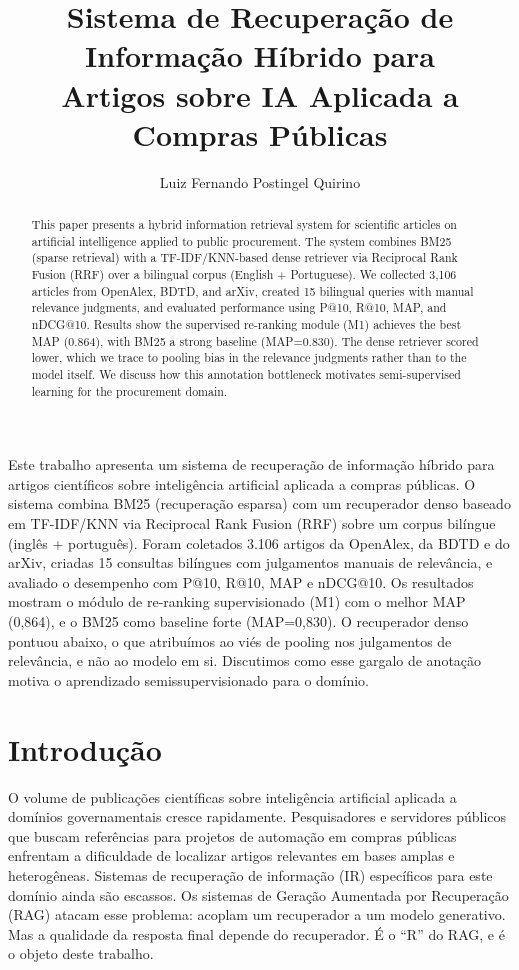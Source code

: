 \documentclass[12pt]{article}
\title{Sistema de Recuperação de Informação Híbrido para\\Artigos sobre IA Aplicada a Compras Públicas}
\author{Luiz Fernando Postingel Quirino\inst{1}}
\begin{document}
\maketitle

\begin{abstract}
This paper presents a hybrid information retrieval system for scientific articles on artificial intelligence applied to public procurement. The system combines BM25 (sparse retrieval) with a TF-IDF/KNN-based dense retriever via Reciprocal Rank Fusion (RRF) over a bilingual corpus (English + Portuguese). We collected 3,106 articles from OpenAlex, BDTD, and arXiv, created 15 bilingual queries with manual relevance judgments, and evaluated performance using P@10, R@10, MAP, and nDCG@10. Results show the supervised re-ranking module (M1) achieves the best MAP (0.864), with BM25 a strong baseline (MAP=0.830). The dense retriever scored lower, which we trace to pooling bias in the relevance judgments rather than to the model itself. We discuss how this annotation bottleneck motivates semi-supervised learning for the procurement domain.
\end{abstract}

\begin{resumo}
Este trabalho apresenta um sistema de recuperação de informação híbrido para artigos científicos sobre inteligência artificial aplicada a compras públicas. O sistema combina BM25 (recuperação esparsa) com um recuperador denso baseado em TF-IDF/KNN via Reciprocal Rank Fusion (RRF) sobre um corpus bilíngue (inglês + português). Foram coletados 3.106 artigos da OpenAlex, da BDTD e do arXiv, criadas 15 consultas bilíngues com julgamentos manuais de relevância, e avaliado o desempenho com P@10, R@10, MAP e nDCG@10. Os resultados mostram o módulo de re-ranking supervisionado (M1) com o melhor MAP (0,864), e o BM25 como baseline forte (MAP=0,830). O recuperador denso pontuou abaixo, o que atribuímos ao viés de pooling nos julgamentos de relevância, e não ao modelo em si. Discutimos como esse gargalo de anotação motiva o aprendizado semissupervisionado para o domínio.
\end{resumo}

\section{Introdução}

O volume de publicações científicas sobre inteligência artificial aplicada a domínios governamentais cresce rapidamente. Pesquisadores e servidores públicos que buscam referências para projetos de automação em compras públicas enfrentam a dificuldade de localizar artigos relevantes em bases amplas e heterogêneas. Sistemas de recuperação de informação (IR) específicos para este domínio ainda são escassos. Os sistemas de Geração Aumentada por Recuperação (RAG) \cite{lewis2020,gao2024} atacam esse problema: acoplam um recuperador a um modelo generativo. Mas a qualidade da resposta final depende do recuperador. É o ``R'' do RAG, e é o objeto deste trabalho.
\end{document}

